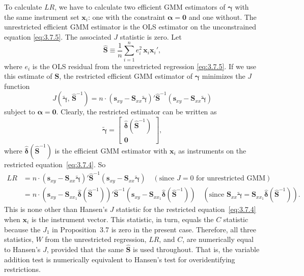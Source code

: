 To calculate $LR$, we have to calculate two efficient GMM estimators of
$\boldsymbol{\gamma}$ with the same instrument set $\mathbf{x}_i$: one with the constraint
$\boldsymbol{\alpha} = \mathbf{0}$ and one without.  The unrestricted efficient GMM estimator is the OLS
estimator on the unconstrained equation \eqref{eq:3.7.5}.  The associated $J$ statistic is zero.
Let
\begin{equation}
  \hat{\mathbf{S}} \equiv \frac{1}{n} \sum_{i=1}^{n}
  e_i^2\, \mathbf{x}_i \mathbf{x}_i',
  \label{eq:3.7.6}
\end{equation}
where $e_i$ is the OLS residual from the unrestricted regression \eqref{eq:3.7.5}.  If we use
this estimate of $\mathbf{S}$, the restricted efficient GMM estimator of $\boldsymbol{\gamma}$ minimizes the $J$
function
\[
  J(\tilde{\boldsymbol{\gamma}},\, \hat{\mathbf{S}}^{-1})
  = n \cdot (\mathbf{s}_{xy} - \mathbf{S}_{xx}\tilde{\boldsymbol{\gamma}})'
  \hat{\mathbf{S}}^{-1}
  (\mathbf{s}_{xy} - \mathbf{S}_{xx}\tilde{\boldsymbol{\gamma}})
\]
subject to $\boldsymbol{\alpha} = \mathbf{0}$.  Clearly, the restricted estimator can be written as
\[
  \tilde{\boldsymbol{\gamma}}
  = \begin{bmatrix} \hat{\boldsymbol{\delta}}(\hat{\mathbf{S}}^{-1}) \\ \mathbf{0} \end{bmatrix},
\]
where $\hat{\boldsymbol{\delta}}(\hat{\mathbf{S}}^{-1})$ is the efficient GMM estimator with $\mathbf{x}_i$ as instruments on the restricted
equation~\eqref{eq:3.7.4}.  So
\begin{align*}
  LR &= n \cdot (\mathbf{s}_{xy} - \mathbf{S}_{xx}\tilde{\boldsymbol{\gamma}})'
    \hat{\mathbf{S}}^{-1}(\mathbf{s}_{xy} - \mathbf{S}_{xx}\tilde{\boldsymbol{\gamma}})
    \quad (\text{since } J = 0 \text{ for unrestricted GMM}) \\
  &= n \cdot (\mathbf{s}_{xy} - \mathbf{S}_{xx_1}\hat{\boldsymbol{\delta}}(\hat{\mathbf{S}}^{-1}))'
    \hat{\mathbf{S}}^{-1}
    (\mathbf{s}_{xy} - \mathbf{S}_{xx_1}\hat{\boldsymbol{\delta}}(\hat{\mathbf{S}}^{-1}))
    \quad (\text{since } \mathbf{S}_{xx}\tilde{\boldsymbol{\gamma}}
    = \mathbf{S}_{xx_1}\hat{\boldsymbol{\delta}}(\hat{\mathbf{S}}^{-1})).
\end{align*}
This is none other than Hansen's $J$ statistic for the restricted equation~\eqref{eq:3.7.4}
when $\mathbf{x}_i$ is the instrument vector.  This statistic, in turn, equals the $C$ statistic
because the $J_1$ in Proposition~3.7 is zero in the present case.  Therefore, all three
statistics, $W$ from the unrestricted regression, $LR$, and $C$, are numerically equal to
Hansen's $J$, provided that the same $\hat{\mathbf{S}}$ is used throughout.  That is, the variable
addition test is numerically equivalent to Hansen's test for overidentifying restrictions.

